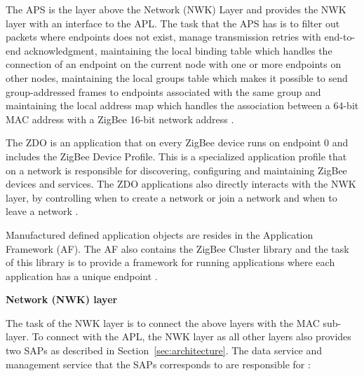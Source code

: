 The APS is the layer above the Network (NWK) Layer and provides the NWK layer with an interface to the APL.  The task that the APS has is to filter out packets where endpoints does not exist, manage transmission retries with end-to-end acknowledgment, maintaining the local binding table which handles the connection of an endpoint on the current node with one or more endpoints on other nodes, maintaining the local groups table which makes it possible to send group-addressed frames to endpoints associated with the same group and maintaining the local address map which handles the association between a 64-bit MAC address with a ZigBee 16-bit network address \citep{gislason2008zigbee, zigbee2007spec}.

The ZDO is an application that on every ZigBee device runs on endpoint 0 and includes the ZigBee Device Profile. This is a specialized application profile that on a network is responsible for discovering, configuring and maintaining ZigBee devices and services.  The ZDO applications also directly interacts with the NWK layer, by controlling when to create a network or join a network and when to leave a network \citep{gislason2008zigbee}.

Manufactured defined application objects are resides in the Application Framework (AF). The AF also contains the ZigBee Cluster library and the task of this library is to provide a framework for running applications where each application has a unique endpoint \citep{gislason2008zigbee}.

\vspace{5mm}
\textbf{Network (NWK) layer}

The task of the NWK layer is to connect the above layers with the MAC sub-layer. To connect with the APL, the NWK layer as all other layers also provides two SAPs as described in Section~\ref{sec:architecture}. The data service and management service that the SAPs corresponds to are responsible for \citep{farahani2011zigbee, zigbee2007spec}:


